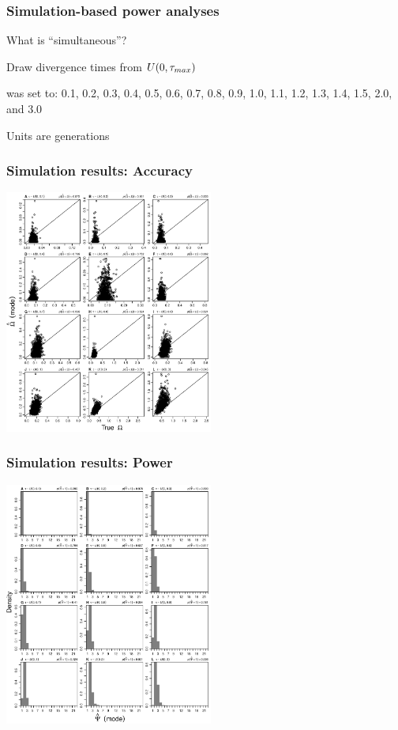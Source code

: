 \begin{frame}
    \frametitle{Simulation-based power analyses}
    What is ``simultaneous''?
    \begin{myitemize}
        \item Draw divergence times from $U(0, \tau_{max})$
        \item {} was set to:
            0.1, 0.2, 0.3, 0.4, 0.5, 0.6, 0.7, 0.8, 0.9, 1.0, 1.1, 1.2, 1.3,
            1.4, 1.5, 2.0, and 3.0
        \item Units are \globalcoalunit generations
    \end{myitemize}
\end{frame}

\begin{frame}
    \frametitle{Simulation results: Accuracy}
    \centerline{
    \includegraphics[height=8cm]{images/SS_accuracy_omega_modes_GLM.pdf}}
\end{frame}

\begin{frame}
    \frametitle{Simulation results: Power}
    \centerline{
    \includegraphics[height=8cm]{images/SS_power_psi_modes_GLM.pdf}}
\end{frame}

